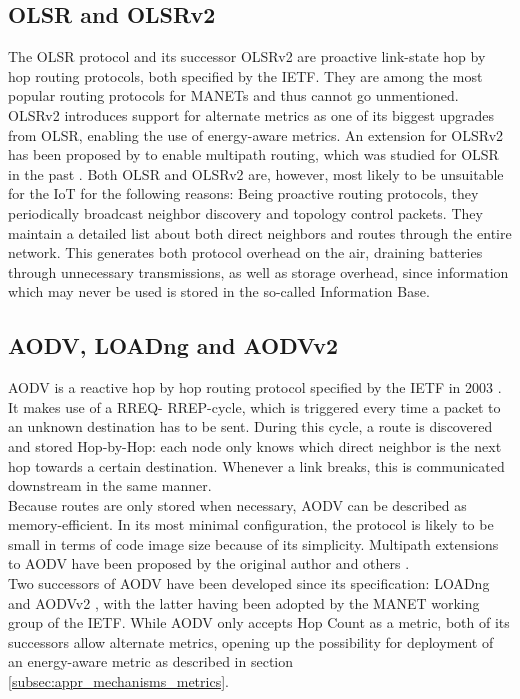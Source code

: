 \subsection{OLSR and OLSRv2}
\label{subsec:olsr}
The \gls{OLSR} protocol \cite{RFC-3626} and its successor OLSRv2 \cite{RFC-7181} are proactive link-state hop by hop routing protocols, both specified by the IETF. They are among the most popular routing protocols for \glspl{MANET} and thus cannot go unmentioned.
OLSRv2 introduces support for alternate metrics as one of its biggest upgrades from OLSR, enabling the use of energy-aware metrics. An extension for OLSRv2 has been proposed by \cite{olsrv2_multipath} to enable multipath routing, which was studied for OLSR in the past \cite{olsr_multipath}.
Both OLSR and OLSRv2 are, however, most likely to be unsuitable for the IoT for the following reasons:
Being proactive routing protocols, they periodically broadcast neighbor discovery and topology control packets. They maintain a detailed list about both direct neighbors and routes through the entire network. This generates both protocol overhead on the air, draining batteries through unnecessary transmissions, as well as storage overhead, since information which may never be used is stored in the so-called Information Base.

\subsection{AODV, LOADng and AODVv2}
\label{subsec:aodv}
\gls{AODV} is a reactive hop by hop routing protocol specified by the IETF in 2003 \cite{rfc3561}.
It makes use of a \gls{RREQ}- \gls{RREP}-cycle, which is triggered every time a packet to an unknown destination has to be sent. During this cycle, a route is discovered and stored Hop-by-Hop: each node only knows which direct neighbor is the next hop towards a certain destination. Whenever a link breaks, this is communicated downstream in the same manner.\\
Because routes are only stored when necessary, AODV can be described as memory-efficient. In its most minimal configuration, the protocol is %
likely to be small in terms of code image size because of its simplicity.
Multipath extensions to AODV have been proposed by the original author \cite{aodv_multipath_ebr} and others \cite{aodv_multipath_other}.\\
Two successors of AODV have been developed since its specification:
\gls{LOADng} \cite{LOADng} and AODVv2 \cite{AODVv2}, with the latter having been adopted by the \gls{MANET} working group of the \gls{IETF}. While AODV only accepts Hop Count as a metric, both of its successors allow alternate metrics, opening up the possibility for deployment of an energy-aware metric as described in section \ref{subsec:appr_mechanisms_metrics}.

